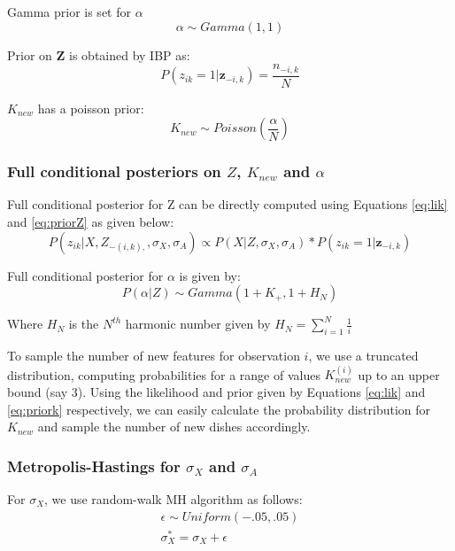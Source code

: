 \documentclass{article}
\begin{document}
Gamma prior is set for $\alpha$
\begin{equation}\label{eq:prioralpha}
\alpha \sim Gamma(1,1)
\end{equation}

Prior on \textbf{Z} is obtained by IBP as:
\begin{equation}\label{eq:priorZ}
P(z_{ik}=1|\textbf{z}_{-i,k}) = \frac{n_{-i,k}}{N}
\end{equation}

$K_{new}$ has a poisson prior:
\begin{equation}\label{eq:priork}
K_{new} \sim Poisson(\frac{\alpha}{N})
\end{equation}



\subsubsection{Full conditional posteriors on $Z$, $K_{new}$ and $\alpha$}
Full conditional posterior for Z can be directly computed using Equations \eqref{eq:lik} and \eqref{eq:priorZ} as given below:
\begin{equation}\label{eq:postZ}
P(z_{ik}|X,Z_{-(i,k),},\sigma_X,\sigma_A) \propto  P(X|Z,\sigma_X, \sigma_A) * P(z_{ik}=1|\textbf{z}_{-i,k}) 
\end{equation}

Full conditional posterior for $\alpha$ is given by:
\begin{equation}\label{eq:postalpha}
P(\alpha|Z) \sim Gamma(1+K_+,1+H_N)
\end{equation}

Where $H_N$ is the $N^{th}$ harmonic number given by $H_N=\sum_{i=1}^{N} \frac{1}{i}$

To sample the number of new features for observation $i$, we use a truncated distribution, computing probabilities for a range of values $K_{new}^{(i)}$ up to an upper bound (say 3). Using the likelihood and prior given by Equations \eqref{eq:lik} and \eqref{eq:priork} respectively, we can easily calculate the probability distribution for $K_{new}$ and sample the number of new dishes accordingly.




\subsubsection{Metropolis-Hastings for $\sigma_X$ and $\sigma_A$}
For $\sigma_X$, we use random-walk MH algorithm as follows:
\begin{eqnarray}
\epsilon \sim Uniform(-.05,.05)\\
\sigma_X^{*} =  \sigma_X +\epsilon\\
\end{eqnarray}
\end{document}
